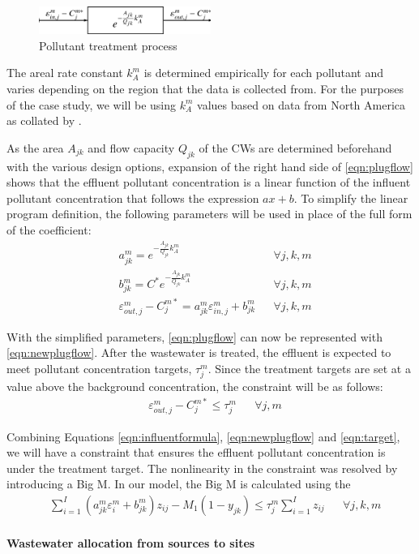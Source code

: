 \documentclass[preprint,12pt,authoryear]{elsarticle}
\begin{document}
\begin{figure}[!htpb]
	\centering
	\includegraphics[width=0.5\textwidth]{plugflow.png}
	\caption{Pollutant treatment process}
	\label{fig:plugflow}
\end{figure}

The areal rate constant $k_A^m$ is determined empirically for each pollutant and varies depending on the region that the data is collected from. For the purposes of the case study, we will be using $k_A^m$ values based on data from North America as collated by \cite{vymazal2008}. 

As the area $A_{jk}$ and flow capacity $Q_{jk}$ of the CWs are determined beforehand with the various design options, expansion of the right hand side of \autoref{eqn:plugflow} shows that the effluent pollutant concentration is a linear function of the influent pollutant concentration that follows the expression $ax+b$. To simplify the linear program definition, the following parameters will be used in place of the full form of the coefficient: 
\begin{align}
	&a_{jk}^m = e^{-\frac{A_{jk}}{Q_{jk}}k_A^m} &&\forall j,k,m\nonumber\\
	&b_{jk}^m = C^* e^{-\frac{A_{jk}}{Q_{jk}}k_A^m} &&\forall j,k,m\nonumber\\
	&\varepsilon_{out,j}^m - C_j^{m*} = a_{jk}^m \varepsilon_{in,j}^m + b_{jk}^m && \forall j,k,m \label{eqn:newplugflow}
\end{align}

With the simplified parameters, \autoref{eqn:plugflow} can now be represented with \autoref{eqn:newplugflow}. After the wastewater is treated, the effluent is expected to meet pollutant concentration targets, $\tau_j^m$. Since the treatment targets are set at a value above the background concentration, the constraint will be as follows:
\begin{align}
	&\varepsilon_{out,j}^m - C_j^{m*} \leq \tau_j^m && \forall j,m \label{eqn:target}
\end{align}

Combining Equations \ref{eqn:influentformula}, \ref{eqn:newplugflow} and \ref{eqn:target}, we will have a constraint that ensures the effluent pollutant concentration is under the treatment target. The nonlinearity in the constraint was resolved by introducing a Big M. In our model, the Big M is calculated using the %
\begin{align}
	&\sum_{i=1}^{I} (a_{jk}^m \varepsilon_i^m + b_{jk}^m) z_{ij} - M_1(1 - y_{jk}) \leq \tau_j^m \sum_{i=1}^I z_{ij}  && \forall j,k,m
\end{align}
\\
\noindent\textbf{Wastewater allocation from sources to sites} 
\end{document}
